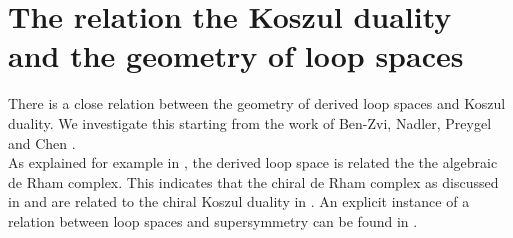 \section{The relation the Koszul duality and the geometry of loop spaces} 

There is a close relation between the geometry of derived loop spaces and Koszul
duality. We investigate this starting from the work of Ben-Zvi, Nadler, Preygel
\cite{Preygel17}
and Chen \cite{Chen23}.\\
As explained for example in \cite{BenZvi12}, the derived loop space is related the
the algebraic de Rham complex. This indicates that the chiral de Rham complex as
discussed in \cite{BenZvi08} and \cite{Malikov99} are related to the chiral
Koszul duality in \cite{Francis11}. An explicit instance of a relation between
loop spaces and supersymmetry can be found in \cite{Kapranov10}. 

